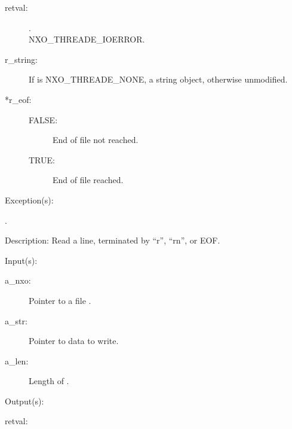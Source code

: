 \begin{capi}
\begin{capilist}
		\begin{description}\item[]
		\item[retval: ]
			\begin{description}\item[]
			\item[.]
			\item[
				{NXO_THREADE_IOERROR}.]
			\end{description}
		\item[r\_string: ]
			If  is NXO\_THREADE\_NONE, a string object,
			otherwise unmodified.
		\item[*r\_eof: ]
			\begin{description}\item[]
			\item[FALSE: ]
				End of file not reached.
			\item[TRUE: ]
				End of file reached.
			\end{description}
		\end{description}
	\item[Exception(s): ]
		\begin{description}\item[]
		\item[.]
		\end{description}
	\item[Description: ]
		Read a line, terminated by ``{\bs}r'', ``{\bs}r{\bs}n'', or EOF.
	\end{capilist}
\label{nxo_file_write}
	\begin{capilist}
	\item[Input(s): ]
		\begin{description}\item[]
		\item[a\_nxo: ]
			Pointer to a file .
		\item[a\_str: ]
			Pointer to data to write.
		\item[a\_len: ]
			Length of .
		\end{description}
	\item[Output(s): ]
		\begin{description}\item[]
		\item[retval: ]

\end{description}
\end{capilist}
\end{capi}
